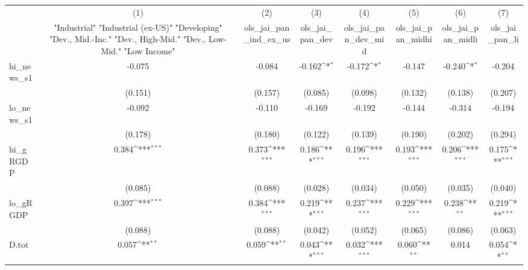 {
\def\sym#1{\ifmmode^{#1}\else\(^{#1}\)\fi}
\begin{tabular}{l*{7}{c}}
\toprule
            &\multicolumn{1}{c}{(1)}&\multicolumn{1}{c}{(2)}&\multicolumn{1}{c}{(3)}&\multicolumn{1}{c}{(4)}&\multicolumn{1}{c}{(5)}&\multicolumn{1}{c}{(6)}&\multicolumn{1}{c}{(7)}\\
            &\multicolumn{1}{c}{ "Industrial" "Industrial (ex-US)" "Developing" "Dev., Mid.-Inc." "Dev., High-Mid."  "Dev., Low-Mid." "Low Income" }&\multicolumn{1}{c}{ols\_jai\_pan\_ind\_ex\_us}&\multicolumn{1}{c}{ols\_jai\_pan\_dev}&\multicolumn{1}{c}{ols\_jai\_pan\_dev\_mid}&\multicolumn{1}{c}{ols\_jai\_pan\_midhi}&\multicolumn{1}{c}{ols\_jai\_pan\_midli}&\multicolumn{1}{c}{ols\_jai\_pan\_li}\\
\midrule
hi\_news\_s1  &      -0.075         &      -0.084         &      -0.162\sym{*}  &      -0.172\sym{*}  &      -0.147         &      -0.240\sym{*}  &      -0.204         \\
            &     (0.151)         &     (0.157)         &     (0.085)         &     (0.098)         &     (0.132)         &     (0.138)         &     (0.207)         \\
\addlinespace
lo\_news\_s1  &      -0.092         &      -0.110         &      -0.169         &      -0.192         &      -0.144         &      -0.314         &      -0.194         \\
            &     (0.178)         &     (0.180)         &     (0.122)         &     (0.139)         &     (0.190)         &     (0.202)         &     (0.294)         \\
\addlinespace
hi\_gRGDP    &       0.384\sym{***}&       0.373\sym{***}&       0.186\sym{***}&       0.196\sym{***}&       0.193\sym{***}&       0.206\sym{***}&       0.175\sym{***}\\
            &     (0.085)         &     (0.088)         &     (0.028)         &     (0.034)         &     (0.050)         &     (0.035)         &     (0.040)         \\
\addlinespace
lo\_gRGDP    &       0.397\sym{***}&       0.384\sym{***}&       0.219\sym{***}&       0.237\sym{***}&       0.229\sym{***}&       0.238\sym{**} &       0.219\sym{***}\\
            &     (0.088)         &     (0.088)         &     (0.042)         &     (0.052)         &     (0.065)         &     (0.086)         &     (0.063)         \\
\addlinespace
D.tot       &       0.057\sym{**} &       0.059\sym{**} &       0.043\sym{***}&       0.032\sym{***}&       0.060\sym{**} &       0.014         &       0.054\sym{**} \\

\end{tabular}}
